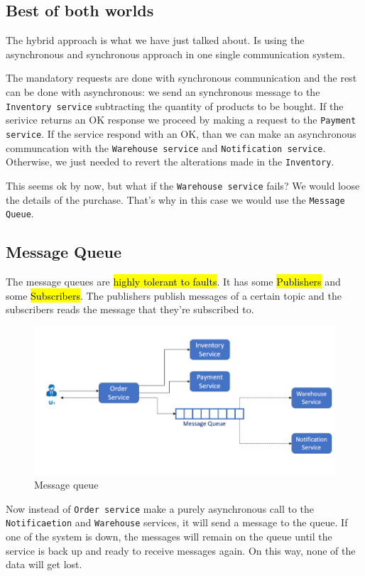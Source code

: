 \subsection{Best of both worlds}

The hybrid approach is what we have just talked about. Is using the asynchronous and 
synchronous approach in one single communication system.   

The mandatory requests are done with synchronous communication and the rest can 
be done with asynchronous: we send an synchronous message to the \texttt{Inventory service}
subtracting the quantity of products to be bought. If the serivice returns an OK response 
we proceed by making a request to the \texttt{Payment service}. If the service respond with an 
OK, than we can make an asynchronous communcation with the \texttt{Warehouse service} and 
\texttt{Notification service}. Otherwise, we just needed to revert the alterations made in 
the \texttt{Inventory}. 

This seems ok by now, but what if the \texttt{Warehouse service} fails? We would loose the details 
of the purchase. That's why in this case we would use the \texttt{Message Queue}. 


\subsection{Message Queue}

The message queues are \hl{highly tolerant to faults}. It has some \hl{Publishers} and 
some \hl{Subscribers}. The publishers publish messages of a certain topic and the subscribers 
reads the message that they're subscribed to. 

\begin{figure}[h]
\centering
\includegraphics[width=0.8\linewidth]{figures/02_interservice_communication/message_queue.png}
\caption{Message queue}
\label{fig:message_queue}
\end{figure}


Now instead of \texttt{Order service} make a purely asynchronous call to the \texttt{Notificaetion} and 
\texttt{Warehouse} services, it will send a message to the queue. If one of the system is down, the messages
will remain on the queue until the service is back up and ready to receive messages again. 
On this way, none of the data will get lost. 

